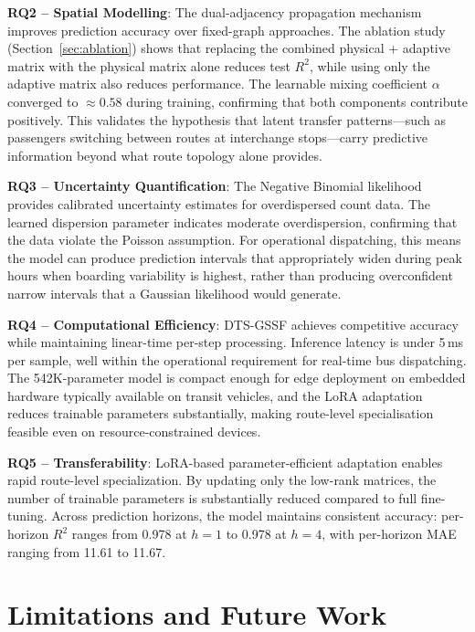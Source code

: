 \textbf{RQ2 -- Spatial Modelling}: The dual-adjacency propagation mechanism improves prediction accuracy over fixed-graph approaches. The ablation study (Section~\ref{sec:ablation}) shows that replacing the combined physical + adaptive matrix with the physical matrix alone reduces test $R^2$, while using only the adaptive matrix also reduces performance. The learnable mixing coefficient $\alpha$ converged to $\approx 0.58$ during training, confirming that both components contribute positively. This validates the hypothesis that latent transfer patterns---such as passengers switching between routes at interchange stops---carry predictive information beyond what route topology alone provides.

\textbf{RQ3 -- Uncertainty Quantification}: The Negative Binomial likelihood provides calibrated uncertainty estimates for overdispersed count data. The learned dispersion parameter indicates moderate overdispersion, confirming that the data violate the Poisson assumption. For operational dispatching, this means the model can produce prediction intervals that appropriately widen during peak hours when boarding variability is highest, rather than producing overconfident narrow intervals that a Gaussian likelihood would generate.

\textbf{RQ4 -- Computational Efficiency}: DTS-GSSF achieves competitive accuracy while maintaining linear-time per-step processing. Inference latency is under 5\,ms per sample, well within the operational requirement for real-time bus dispatching. The 542K-parameter model is compact enough for edge deployment on embedded hardware typically available on transit vehicles, and the LoRA adaptation reduces trainable parameters substantially, making route-level specialisation feasible even on resource-constrained devices.

\textbf{RQ5 -- Transferability}: LoRA-based parameter-efficient adaptation enables rapid route-level specialization. By updating only the low-rank matrices, the number of trainable parameters is substantially reduced compared to full fine-tuning. Across prediction horizons, the model maintains consistent accuracy: per-horizon $R^2$ ranges from 0.978 at $h=1$ to 0.978 at $h=4$, with per-horizon MAE ranging from 11.61 to 11.67.

\section{Limitations and Future Work}
\label{sec:limitations}

